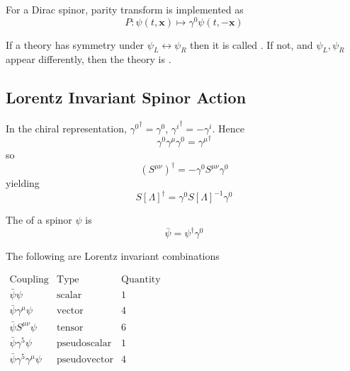 \documentclass{article}
\begin{document}
\begin{fact}
For a Dirac spinor, parity transform is implemented as 
\[
P: \psi(t,\bm{x}) \mapsto \gamma^0 \psi(t,-\bm{x})
\]
\end{fact}

\begin{definition}
If a theory has symmetry under $\psi_L \leftrightarrow \psi_R$ then it is called . If not, and $\psi_L, \psi_R$ appear differently, then the theory is . 
\end{definition}

\subsection{Lorentz Invariant Spinor Action}

\begin{fact}
In the chiral representation, ${\gamma^0}^\dagger=\gamma^0$, ${\gamma^i}^\dagger=-\gamma^i$. Hence
\[
\gamma^0 \gamma^\mu \gamma^0={\gamma^\mu}^\dagger
\]
so 
\[
(S^{\mu\nu})^\dagger=-\gamma^0 S^{\mu\nu} \gamma^0
\]
yielding
\[
S[\Lambda]^\dagger=\gamma^0 S[\Lambda]^{-1} \gamma^0
\]
\end{fact}

\begin{definition}
The  of a spinor $\psi$ is 
\[
\bar{\psi}=\psi^\dagger \gamma^0
\]
\end{definition}

\begin{theorem}
The following are Lorentz invariant combinations
\begin{center}$
\begin{array}{ccc}
    \text{Coupling} & \text{Type} & \text{Quantity} \\
    \hline
    \hline
    \bar{\psi}\psi & \text{scalar} & 1 \\
    \bar{\psi}\gamma^\mu\psi & \text{vector} & 4 \\
    \bar{\psi} S^{\mu\nu} \psi & \text{tensor} & 6 \\
    \bar{\psi}\gamma^5\psi & \text{pseudoscalar} & 1 \\
    \bar{\psi}\gamma^5\gamma^\mu\psi & \text{pseudovector} & 4 \\
\end{array}
$\end{center}
\end{theorem}
\end{document}
